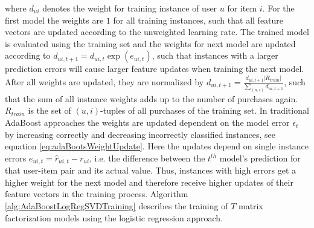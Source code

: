 \documentclass[10pt]{reportMaster}
\begin{document}
where $d_{ui}$ denotes the weight for training instance of user $u$ for item $i$.
For the first model the weights are $1$ for all training instances, such that all feature vectors are updated according to the unweighted learning rate.
The trained model is evaluated using the training set and the weights for next model are updated according to $d_{ui,t+1} = d_{ui,t} \exp(e_{ui,t})$, such that instances with a larger prediction errors will cause larger feature updates when training the next model.
After all weights are updated, they are normalized by $d_{ui,t+1} = \frac{d_{ui,t+1} |R_{train}|}{\sum_{(u,i)}{d_{ui,t+1}}}$, such that the sum of all instance weights adds up to the number of purchases again.
$R_{train}$ is the set of $(u,i)$-tuples of all purchases of the training set.
In traditional AdaBoost approaches the weights are updated dependent on the model error $\epsilon_t$ by increasing correctly and decreasing incorrectly classified instances, see equation \ref{eq:adaBootsWeightUpdate}.
Here the updates depend on single instance errors $e_{ui,t} = \hat{r}_{ui, t} - r_{ui}$, i.e. the difference between the $t^{th}$ model's prediction for that user-item pair and its actual value.
Thus, instances with high errors get a higher weight for the next model and therefore receive higher updates of their feature vectors in the training process.
Algorithm \ref{alg:AdaBoostLogRegSVDTraining} describes the training of $T$ matrix factorization models using the logistic regression approach.
\end{document}
